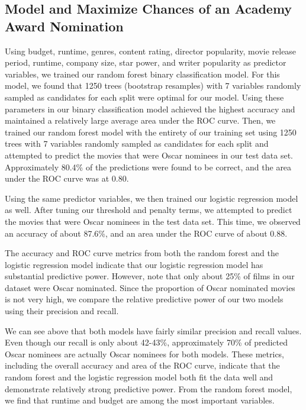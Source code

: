 \documentclass[10pt]{article}
\begin{document}
\subsection{Model and Maximize Chances of an Academy Award Nomination}

Using budget, runtime, genres, content rating, director popularity, movie release period, runtime, company size, star power, and writer popularity as predictor variables, we trained our random forest binary classification model. For this model, we found that 1250 trees (bootstrap resamples) with 7 variables randomly sampled as candidates for each split were optimal for our model. Using these parameters in our binary classification model achieved the highest accuracy and maintained a relatively large average area under the ROC curve. Then, we trained our random forest model with the entirety of our training set using 1250 trees with 7 variables randomly sampled as candidates for each split and attempted to predict the movies that were Oscar nominees in our test data set. Approximately 80.4\% of the predictions were found to be correct, and the area under the ROC curve was at 0.80.

Using the same predictor variables, we then trained our logistic regression model as well. After tuning our threshold and penalty terms, we attempted to predict the movies that were Oscar nominees in the test data set. This time, we observed an accuracy of about 87.6\%, and an area under the ROC curve of about 0.88.

The accuracy and ROC curve metrics from both the random forest and the logistic regression model indicate that our logistic regression model has substantial predictive power. However, note that only about 25\% of films in our dataset were Oscar nominated. Since the proportion of Oscar nominated movies is not very high, we compare the relative predictive power of our two models using their precision and recall.



We can see above that both models have fairly similar precision and recall values. Even though our recall is only about 42-43\%, approximately 70\% of predicted Oscar nominees are actually Oscar nominees for both models. These metrics, including the overall accuracy and area of the ROC curve, indicate that the random forest and the logistic regression model both fit the data well and demonstrate relatively strong predictive power. From the random forest model, we find that runtime and budget are among the most important variables.
\end{document}

